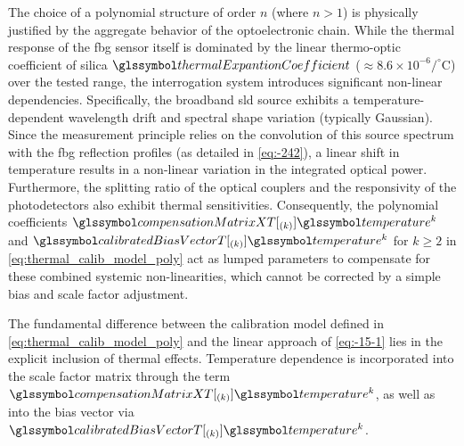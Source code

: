 \documentclass[sensors,article,accept,pdftex,moreauthors]{Definitions/mdpi}
\begin{document}
The choice of a polynomial structure of order $n$ (where $n > 1$) is physically justified by the aggregate behavior of the optoelectronic chain. While the thermal response of the \gls{fbg} sensor itself is dominated by the linear thermo-optic coefficient of silica $\thermalExpantionCoefficient$ ($\approx$$8.6 \times 10^{-6} / ^\circ $C) over the tested range, the interrogation system introduces significant non-linear dependencies. Specifically, the broadband \gls{sld} source exhibits a temperature-dependent wavelength drift and spectral shape variation (typically Gaussian). Since the measurement principle relies on the convolution of this source spectrum with the \gls{fbg} reflection profiles (as detailed in \cref{eq:-242}), a linear shift in temperature results in a non-linear variation in the integrated optical power. Furthermore, the splitting ratio of the optical couplers and the responsivity of the photodetectors also exhibit thermal sensitivities. Consequently, the polynomial coefficients $\compensationMatrixXT[{}_{(k)}] \temperature^k $ and $\calibratedBiasVectorT[{}_{(k)}] \temperature^k$ for $k \ge 2$ in \cref{eq:thermal_calib_model_poly}  act as lumped parameters to compensate for these combined systemic non-linearities, which cannot be corrected by a simple bias and scale factor adjustment.

The fundamental difference between the calibration model defined in \cref{eq:thermal_calib_model_poly} and the linear approach of \cref{eq:-15-1} lies in the explicit inclusion of thermal effects. Temperature dependence is incorporated into the scale factor matrix through the term $\compensationMatrixXT[{}_{(k)}] \temperature^k$, as well as into the bias vector via $\calibratedBiasVectorT[{}_{(k)}] \temperature^k$.
\end{document}
